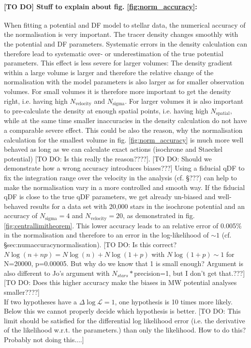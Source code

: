 \documentclass[12pt,preprint]{aastex}
\begin{document}
\paragraph{[TO DO] Stuff to explain about fig. \ref{fig:norm_accuracy}:} When fitting a potential and DF model to stellar data, the numerical accuracy of the normalisation is very important. The tracer density changes smoothly with the potential and DF parameters. Systematic errors in the density calculation can therefore lead to systematic over- or underestimation of the true potential parameters. This effect is less severe for larger volumes: The density gradient within a large volume is larger and therefore the relative change of the normalisation with the model parameters is also larger as for smaller observation volumes. For small volumes it is therefore more important to get the density right, i.e. having high $N_\text{velocity}$ and $N_\text{sigma}$. For larger volumes it is also important to pre-calculate the density at enough spatial points, i.e. having high $N_\text{spatial}$, while at the same time smaller inaccuracies in the density calculation do not have a comparable severe effect. This could be also the reason, why the normalisation calculation for the smallest volume in fig. \ref{fig:norm_accuracy} is much more well behaved as long as we can calculate exact actions (isochrone and Staeckel potential) [TO DO: Is this really the reason????]. [TO DO: Should we demonstrate how a wrong accuracy introduces biases???] Using a fiducial qDF to fix the integration range over the velocity in the analysis  (cf. \S ???) can help to make the normalisation vary in a more controlled and smooth way. If the fiducial qDF is close to the true qDF parameters, we get already un-biased and well-behaved results for a data set with 20,000 stars in the isochrone potential and an accuracy of $N_\text{sigma}=4$ and $N_\text{velocity}=20$, as demonstrated in fig. \ref{fig:centrallimitheorem}. This lower accuracy leads to an relative error of  0.005\% in the normalisation and therefore to an error in the log-likelihood of $\sim1$ (cf. \S{sec:numaccuracynormalisation}). [TO DO: Is this correct? $N \log(n+np) = N\log(n) + N\log(1+p)$ with $N\log(1+p)\sim 1$ for N=20000, p=0.00005. But why do we know that 1 is small enough? Argument is also different to Jo's argument with $N_{stars}*$precision=1, but I don't get that.???]  [TO DO: Does this higher accuracy make the biases in MW potential analyses smaller????]\\If two hypotheses have a $\Delta \log \mathscr{L} = 1$, one hypothesis is 10 times more likely. Below this we cannot properly decide which hypothesis is better. [TO DO: This limit should be satisfied for the differential log likelihood error (i.e. the derivative of the likelihood w.r.t. the parameters.) than only the likelihood. How to do this? Probably not doing this....]
\end{document}
